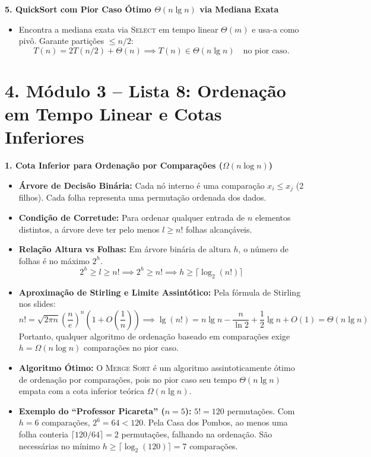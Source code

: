 \documentclass[11pt,a4paper]{article}
\newcommand{\topico}[1]{\par\medskip\textbf{\color{azul}#1}\par}
\newcommand{\secao}[1]{\section*{\color{azul}#1}}
\begin{document}
\topico{5. QuickSort com Pior Caso Ótimo $\Theta(n \lg n)$ via Mediana Exata}
\begin{itemize}
  \item Encontra a mediana exata via \textsc{Select} em tempo linear $\Theta(m)$ e usa-a como pivô. Garante partições $\le n/2$:
  \[
  T(n) = 2T(n/2) + \Theta(n) \implies T(n) \in \Theta(n \lg n) \quad \text{no pior caso}.
  \]
\end{itemize}

\newpage
\newpage
\secao{4. Módulo 3 -- Lista 8: Ordenação em Tempo Linear e Cotas Inferiores}

\topico{1. Cota Inferior para Ordenação por Comparações ($\Omega(n \log n)$)}
\begin{itemize}
  \item \textbf{Árvore de Decisão Binária:} Cada nó interno é uma comparação $x_i \le x_j$ (2 filhos). Cada folha representa uma permutação ordenada dos dados.
  \item \textbf{Condição de Corretude:} Para ordenar qualquer entrada de $n$ elementos distintos, a árvore deve ter pelo menos $l \ge n!$ folhas alcançáveis.
  \item \textbf{Relação Altura vs Folhas:} Em árvore binária de altura $h$, o número de folhas é no máximo $2^h$.
  \[
  2^h \ge l \ge n! \implies 2^h \ge n! \implies h \ge \lceil \log_2(n!) \rceil
  \]
  \item \textbf{Aproximação de Stirling e Limite Assintótico:}
  Pela fórmula de Stirling nos slides:
  \[
  n! = \sqrt{2\pi n}\left(\frac{n}{e}\right)^n \left(1 + O\left(\frac{1}{n}\right)\right) \implies \lg(n!) = n \lg n - \frac{n}{\ln 2} + \frac{1}{2}\lg n + O(1) = \Theta(n \lg n)
  \]
  Portanto, qualquer algoritmo de ordenação baseado em comparações exige $h = \Omega(n \log n)$ comparações no pior caso.
  \item \textbf{Algoritmo Ótimo:} O \textsc{Merge Sort} é um algoritmo assintoticamente ótimo de ordenação por comparações, pois no pior caso seu tempo $\Theta(n \lg n)$ empata com a cota inferior teórica $\Omega(n \lg n)$.
  \item \textbf{Exemplo do ``Professor Picareta'' ($n=5$):} $5! = 120$ permutações. Com $h=6$ comparações, $2^6 = 64 < 120$. Pela Casa dos Pombos, ao menos uma folha conteria $\lceil 120/64 \rceil = 2$ permutações, falhando na ordenação. São necessárias no mínimo $h \ge \lceil \log_2(120) \rceil = 7$ comparações.
\end{itemize}
\end{document}
